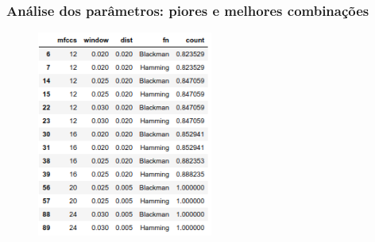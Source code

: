\documentclass{beamer}
\begin{document}
\begin{frame}
    \frametitle{Análise dos parâmetros: piores e melhores combinações}

    \begin{figure}[]
        \centering
        \includegraphics[height=192pt]{Figure_6.png}
    \end{figure}

\end{frame}
\end{document}
